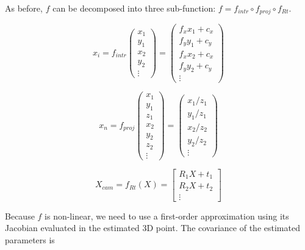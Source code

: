 As before, $f$ can be decomposed into three sub-function: $f = f_{intr} \circ f_{proj} \circ f_{Rt}$.


\begin{equation}
    x_i = f_{intr}\left(\begin{array}{c}
        x_1 \\ y_1 \\ x_2 \\ y_2 \\ \vdots \end{array}\right) = 
        \left(\begin{array}{c}
            f_x x_1 + c_x \\
            f_y y_1 + c_y \\
            f_x x_2 + c_x \\
            f_y y_2 + c_y \\
            \vdots
        \end{array}\right)
\end{equation}

\begin{equation}
    x_n = f_{proj}\left(\begin{array}{c}
        x_1 \\ y_1 \\ z_1 \\
        x_2 \\ y_2 \\ z_2 \\ \vdots \end{array}\right) = 
        \left(\begin{array}{c}
            x_1 / z_1 \\ y_1 / z_1 \\
            x_2 / z_2 \\ y_2 / z_2 \\ 
            \vdots
        \end{array}\right)
\end{equation}

\begin{equation}
    X_{cam} = f_{Rt}(X) = \left[\begin{array}{c}
        R_1 X + t_1 \\
        R_2 X + t_2 \\
        \vdots
    \end{array}\right]
\end{equation}

Because $f$ is non-linear, we need to use a first-order approximation using its Jacobian evaluated in the estimated 3D point. The covariance of the estimated parameters is

